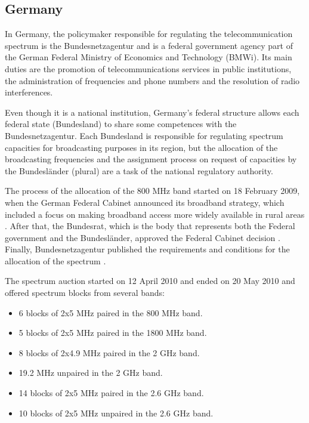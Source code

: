 
\subsection*{Germany}
In Germany, the policymaker responsible for regulating the telecommunication spectrum is the Bundesnetzagentur \cite{2-26} and is a federal government agency part of the German Federal Ministry of Economics and Technology (BMWi). Its main duties are the promotion of telecommunications services in public institutions, the administration of frequencies and phone numbers and the resolution of radio interferences.\par

Even though it is a national institution, Germany’s federal structure allows each federal state (Bundesland) to share some competences with the Bundesnetzagentur. Each Bundesland is responsible for regulating spectrum capacities for broadcasting purposes in its region, but the allocation of the broadcasting frequencies and the assignment process on request of capacities by the Bundesländer (plural) are a task of the national regulatory authority.\par

The process of the allocation of the 800 MHz band started on 18 February 2009, when the German Federal Cabinet announced its broadband strategy, which included a focus on making broadband access more widely available in rural areas \cite{2-27}.  After that, the Bundesrat, which is the body that represents both the Federal government and the Bundesländer, approved the Federal Cabinet decision \cite{2-28}. Finally, Bundesnetzagentur published the requirements and conditions for the allocation of the spectrum \cite{2-29}.\par

The spectrum auction started on 12 April 2010 and ended on 20 May 2010 and offered spectrum blocks from several bands:\par

\begin{itemize}
	\item 6 blocks of 2x5 MHz paired in the 800 MHz band.\par

	\item 5 blocks of 2x5 MHz paired in the 1800 MHz band.\par

	\item 8 blocks of 2x4.9 MHz paired in the 2 GHz band.\par

	\item 19.2 MHz unpaired in the 2 GHz band.\par

	\item 14 blocks of 2x5 MHz paired in the 2.6 GHz band.\par

	\item 10 blocks of 2x5 MHz unpaired in the 2.6 GHz band.
\end{itemize}\par


